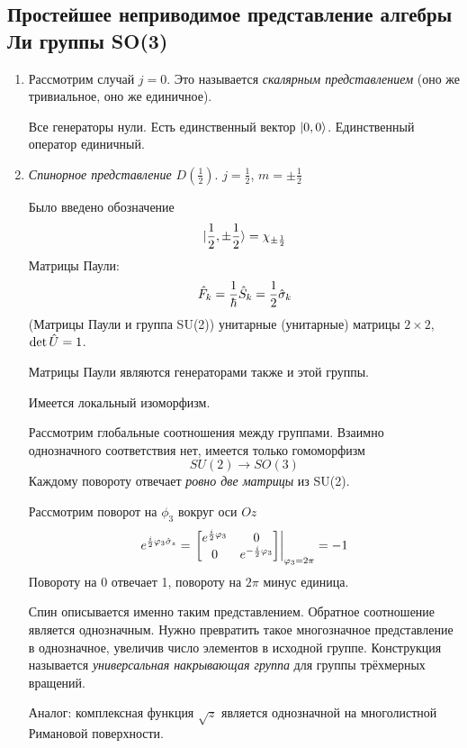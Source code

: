 \subsection{Простейшее неприводимое представление алгебры Ли группы SO(3)}
\begin{enumerate}
  \item Рассмотрим случай $j = 0$. Это называется \emph{скалярным представлением} (оно же тривиальное, оно же единичное).

Все генераторы нули. Есть единственный вектор $\qu{0,0}$. Единственный оператор единичный.
  \item \emph{Спинорное представление $D(\frac12)$}. $j = \frac12$, $m = \pm \frac12$
  
    Было введено обозначение
    $$
        \qu{\frac12, \pm \frac12} = \chi_{\pm \frac12}
    $$
    Матрицы Паули:
    $$
        \Hat F_k = \dfrac{1}{\hbar} \Hat S_k = \dfrac{1}{2} \Hat \sigma_k
    $$
    \Rem (Матрицы Паули и группа SU(2)) унитарные (унитарные) матрицы $2 \times 2$, $\det \Hat U = 1$.
    
    Матрицы Паули являются генераторами также и этой группы.
    
    
    \Ans Имеется локальный изоморфизм.
    
    Рассмотрим глобальные соотношения между группами. Взаимно однозначного соответствия нет, имеется только гомоморфизм
    $$
        SU(2) \to SO(3)
    $$
    Каждому повороту отвечает \emph{ровно две матрицы} из SU(2).
    
    \Example Рассмотрим поворот на $\phi_3$ вокруг оси $Oz$
    $$
        e^{\frac i2 \phi_3 \Hat \sigma_z} = 
        \left.
        \begin{bmatrix}
          e^{\frac i2 \phi_3} & 0 \\
          0 & e^{-\frac i2 \phi_3} \\
        \end{bmatrix}
        \right|_{\phi_3 = 2 \pi} = -1
    $$
    Повороту на 0 отвечает 1, повороту на $2 \pi$ минус единица.
    
    Спин описывается именно таким представлением. Обратное соотношение является однозначным. Нужно превратить такое многозначное представление в однозначное, увеличив число элементов в исходной группе. Конструкция называется \emph{универсальная накрывающая группа} для группы трёхмерных вращений.
    
    Аналог: комплексная функция $\sqrt z$ является однозначной на многолистной Римановой поверхности.
    

\end{enumerate}
